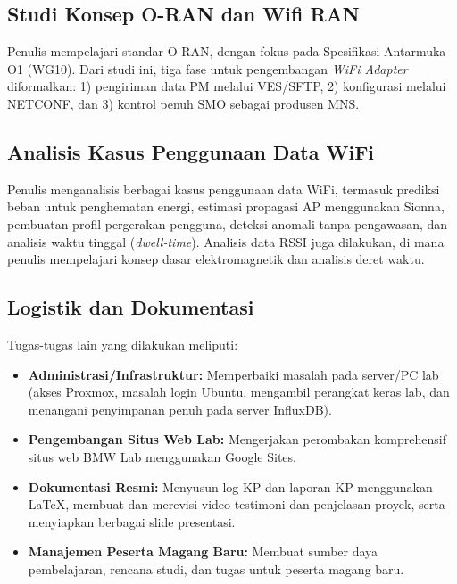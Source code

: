 \subsection{Studi Konsep O-RAN dan Wifi RAN}
Penulis mempelajari standar O-RAN, dengan fokus pada Spesifikasi Antarmuka O1 (WG10). Dari studi ini, tiga fase untuk pengembangan \textit{WiFi Adapter} diformalkan: 1) pengiriman data PM melalui VES/SFTP, 2) konfigurasi melalui NETCONF, dan 3) kontrol penuh SMO sebagai produsen MNS.

\subsection{Analisis Kasus Penggunaan Data WiFi}
Penulis menganalisis berbagai kasus penggunaan data WiFi, termasuk prediksi beban untuk penghematan energi, estimasi propagasi AP menggunakan Sionna, pembuatan profil pergerakan pengguna, deteksi anomali tanpa pengawasan, dan analisis waktu tinggal (\textit{dwell-time}). Analisis data RSSI juga dilakukan, di mana penulis mempelajari konsep dasar elektromagnetik dan analisis deret waktu.

\subsection{Logistik dan Dokumentasi}
Tugas-tugas lain yang dilakukan meliputi:
\begin{itemize}
    \item \textbf{Administrasi/Infrastruktur:} Memperbaiki masalah pada server/PC lab (akses Proxmox, masalah login Ubuntu, mengambil perangkat keras lab, dan menangani penyimpanan penuh pada server InfluxDB).
    \item \textbf{Pengembangan Situs Web Lab:} Mengerjakan perombakan komprehensif situs web BMW Lab menggunakan Google Sites.
    \item \textbf{Dokumentasi Resmi:} Menyusun log KP dan laporan KP menggunakan LaTeX, membuat dan merevisi video testimoni dan penjelasan proyek, serta menyiapkan berbagai slide presentasi.
    \item \textbf{Manajemen Peserta Magang Baru:} Membuat sumber daya pembelajaran, rencana studi, dan tugas untuk peserta magang baru.
\end{itemize}
